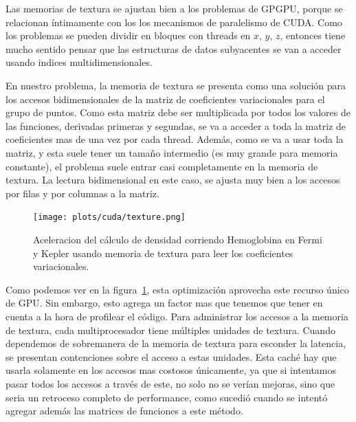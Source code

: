 Las memorias de textura se ajustan bien a los problemas de GPGPU, porque se relacionan
\'intimamente con los los mecanismos de paralelismo de CUDA. Como los problemas se pueden
dividir en bloques con threads en $x$, $y$, $z$, entonces tiene mucho sentido pensar
que las estructuras de datos subyacentes se van a acceder usando indices multidimensionales.

En nuestro problema, la memoria de textura se presenta como una soluci\'on para
los accesos bidimensionales de la matriz de coeficientes variacionales para el grupo de puntos.
Como esta matriz debe ser multiplicada por todos los valores de las funciones,
derivadas primeras y segundas, se va a acceder a toda la matriz de coeficientes mas de
una vez por cada thread. Adem\'as, como se va a usar toda la matriz, y esta suele
tener un tama\~no intermedio (es muy grande para memoria constante), el problema
suele entrar casi completamente en la memoria de textura.
La lectura bidimensional en este caso, se ajusta muy bien a los accesos por filas
y por columnas a la matriz.

\begin{figure}[htbp]
   \centering
   \texttt{[image: plots/cuda/texture.png]}
   \caption{Aceleracion del c\'alculo de densidad corriendo Hemoglobina en Fermi y Kepler
   usando memoria de textura para leer los coeficientes variacionales.}
   \label{plt:texture}
\end{figure}

Como podemos ver en la figura~\ref{plt:texture}, esta optimizaci\'on aprovecha este
recurso \'unico de GPU. Sin embargo, esto agrega un factor mas que tenemos que tener en
cuenta a la hora de profilear el c\'odigo. Para administrar los accesos a
la memoria de textura, cada multiprocesador tiene m\'ultiples unidades de textura.
Cuando dependemos de sobremanera de la memoria de textura para esconder la latencia,
se presentan contenciones sobre el acceso a estas unidades. Esta cach\'e hay que usarla
solamente en los accesos mas costosos \'unicamente, ya que si intentamos pasar todos
los accesos a trav\'es de este, no solo no se ver\'ian mejoras, sino que seria un retroceso
completo de performance, como sucedi\'o cuando se intent\'o agregar adem\'as las matrices
de funciones a este m\'etodo.


